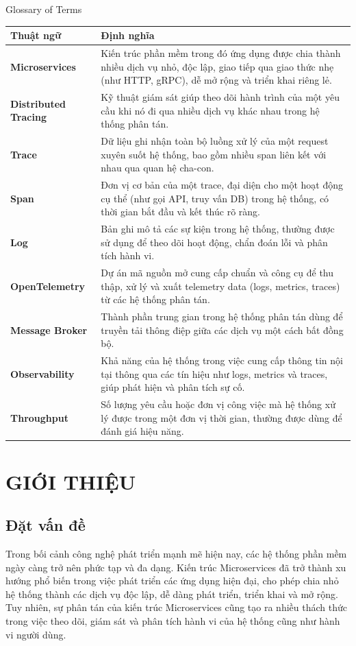 \documentclass{uetgraduation}
\begin{document}
\begin{table}{Glossary of Terms}
\centering
\begin{tabular}{|p{4cm}|p{10cm}|}
\hline
\textbf{Thuật ngữ} & \textbf{Định nghĩa} \\
\hline
\textbf{Microservices} & Kiến trúc phần mềm trong đó ứng dụng được chia thành nhiều dịch vụ nhỏ, độc lập, giao tiếp qua giao thức nhẹ (như HTTP, gRPC), dễ mở rộng và triển khai riêng lẻ. \\
\hline
\textbf{Distributed Tracing} & Kỹ thuật giám sát giúp theo dõi hành trình của một yêu cầu khi nó đi qua nhiều dịch vụ khác nhau trong hệ thống phân tán. \\
\hline
\textbf{Trace} & Dữ liệu ghi nhận toàn bộ luồng xử lý của một request xuyên suốt hệ thống, bao gồm nhiều span liên kết với nhau qua quan hệ cha-con. \\
\hline
\textbf{Span} & Đơn vị cơ bản của một trace, đại diện cho một hoạt động cụ thể (như gọi API, truy vấn DB) trong hệ thống, có thời gian bắt đầu và kết thúc rõ ràng. \\
\hline
\textbf{Log} & Bản ghi mô tả các sự kiện trong hệ thống, thường được sử dụng để theo dõi hoạt động, chẩn đoán lỗi và phân tích hành vi. \\
\hline
\textbf{OpenTelemetry} & Dự án mã nguồn mở cung cấp chuẩn và công cụ để thu thập, xử lý và xuất telemetry data (logs, metrics, traces) từ các hệ thống phân tán. \\
\hline
\textbf{Message Broker} & Thành phần trung gian trong hệ thống phân tán dùng để truyền tải thông điệp giữa các dịch vụ một cách bất đồng bộ. \\
\hline
\textbf{Observability} & Khả năng của hệ thống trong việc cung cấp thông tin nội tại thông qua các tín hiệu như logs, metrics và traces, giúp phát hiện và phân tích sự cố. \\
\hline
\textbf{Throughput} & Số lượng yêu cầu hoặc đơn vị công việc mà hệ thống xử lý được trong một đơn vị thời gian, thường được dùng để đánh giá hiệu năng. \\
\hline
\end{tabular}
\end{table}


       \chapter{GIỚI THIỆU}

\section{Đặt vấn đề}
Trong bối cảnh công nghệ phát triển mạnh mẽ hiện nay, các hệ thống phần mềm ngày càng trở nên phức tạp và đa dạng. Kiến trúc Microservices \cite{Microservices} đã trở thành xu hướng phổ biến trong việc phát triển các ứng dụng hiện đại, cho phép chia nhỏ hệ thống thành các dịch vụ độc lập, dễ dàng phát triển, triển khai và mở rộng. Tuy nhiên, sự phân tán của kiến trúc Microservices cũng tạo ra nhiều thách thức trong việc theo dõi, giám sát và phân tích hành vi của hệ thống cũng như hành vi người dùng.
\end{document}
